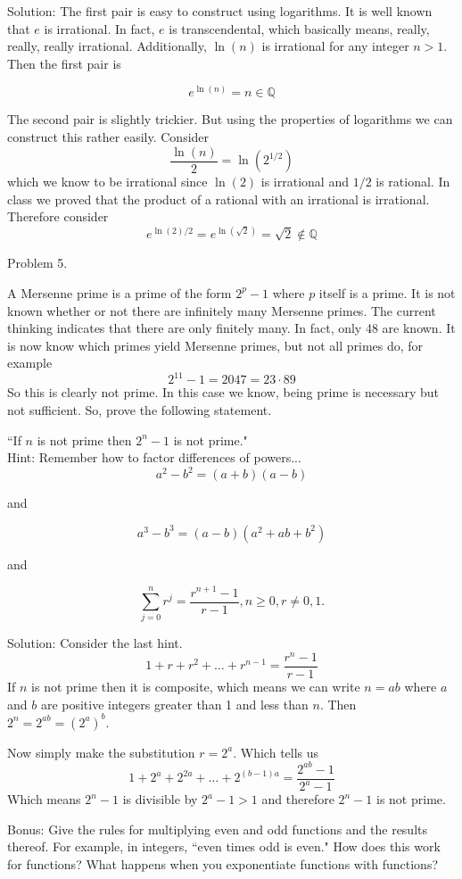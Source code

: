 \documentclass[16 pt]{amsart}
\theoremstyle{definition}
\theoremstyle{remark}
\numberwithin{equation}{subsection}
\newcommand{\Q}{\mathbb{Q}}
\begin{document}
Solution:  The first pair is easy to construct using logarithms.  It is well known that $e$ is irrational.  In fact, $e$ is transcendental, which basically means, really, really, really irrational.  Additionally, $\ln(n)$ is irrational for any integer $n>1$.  Then the first pair is

\[
e^{\ln(n)} = n \in \Q
\]

The second pair is slightly trickier.  But using the properties of logarithms we can construct this rather easily.
Consider 
\[
\frac{\ln(n)}{2} = \ln(2^{1/2})
\]
which we know to be irrational since $\ln(2)$ is irrational and $1/2$ is rational.  In class we proved that the product of a rational with an irrational is irrational.
Therefore consider
\[
e^{\ln(2)/2} = e^{\ln(\sqrt{2})} = \sqrt{2} \notin \Q
\]



\newpage

Problem 5. 

A Mersenne prime is a prime of the form $2^p -1$ where $p$ itself is a prime.  It is not known whether or not there are infinitely many Mersenne primes.  The current thinking indicates that there are only finitely many.  In fact, only 48 are known.  It is now know which primes yield Mersenne primes, but not all primes do, for example
\[
2^{11}-1 = 2047 = 23 \cdot 89 
\]
So this is clearly not prime.  In this case we know, being prime is necessary but not sufficient.  So, prove the following statement.\\

\vspace{.5in}

``If $n$ is not prime then $2^n-1$ is not prime."\\

Hint: Remember how to factor differences of powers... 
\[
a^2-b^2 = (a+b)(a-b)
\]
\begin{center} and \end{center}
\[
a^3 - b^3 = (a-b)(a^2+ab+b^2)
\]
\begin{center} and \end{center}
\[
\sum_{j=0}^{n} r^j = \frac{r^{n+1}-1}{r-1}, n\ge 0, r\ne 0,1.
\]


\vspace{.5in}

Solution:  Consider the last hint.
\[
1+ r + r^2 + \dots + r^{n-1} = \frac{r^n -1}{r-1}
\]
If $n$ is not prime then it is composite, which means we can write $n=ab$ where $a$ and $b$ are positive integers greater than 1 and less than $n$.  Then $2^n = 2^{ab} = (2^a)^b$.

Now simply make the substitution $r = 2^a$.  Which tells us
\[
1 + 2^a + 2^{2a} + \dots + 2^{(b-1)a} = \frac{2^{ab}-1}{2^a -1} 
\]
Which means $2^n-1$ is divisible by $2^a - 1 > 1$ and therefore $2^n -1$ is not prime.

\newpage

Bonus: Give the rules for multiplying even and odd functions and the results thereof.  For example, in integers, ``even times odd is even." How does this work for functions?  What happens when you exponentiate functions with functions?
\end{document}
